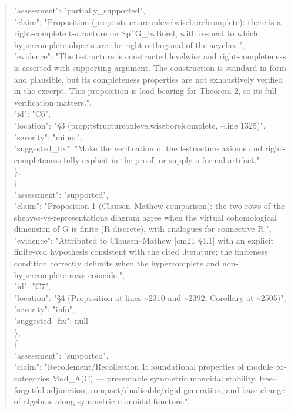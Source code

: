 \documentclass[11pt]{article}
\begin{document}
\begin{quote}
      "assessment": "partially\_supported",\\
      "claim": "Proposition (prop:tstructureonlevelwiseborelcomplete): there is a right-complete t-structure on Sp\^{}G\_lwBorel, with respect to which hypercomplete objects are the right orthogonal of the acyclics.",\\
      "evidence": "The t-structure is constructed levelwise and right-completeness is asserted with supporting argument. The construction is standard in form and plausible, but its completeness properties are not exhaustively verified in the excerpt. This proposition is load-bearing for Theorem 2, so its full verification matters.",\\
      "id": "C6",\\
      "location": "§3 (prop:tstructureonlevelwiseborelcomplete, \~{}line 1325)",\\
      "severity": "minor",\\
      "suggested\_fix": "Make the verification of the t-structure axioms and right-completeness fully explicit in the proof, or supply a formal artifact."\\
    \},\\
    \{\\
      "assessment": "supported",\\
      "claim": "Proposition 1 (Clausen--Mathew comparison): the two rows of the sheaves-vs-representations diagram agree when the virtual cohomological dimension of G is finite (R discrete), with analogues for connective R.",\\
      "evidence": "Attributed to Clausen--Mathew [cm21 §4.1] with an explicit finite-vcd hypothesis consistent with the cited literature; the finiteness condition correctly delimits when the hypercomplete and non-hypercomplete rows coincide.",\\
      "id": "C7",\\
      "location": "§4 (Proposition at lines \~{}2310 and \~{}2392; Corollary at \~{}2505)",\\
      "severity": "info",\\
      "suggested\_fix": null\\
    \},\\
    \{\\
      "assessment": "supported",\\
      "claim": "Recollement/Recollection 1: foundational properties of module \ensuremath{\infty}-categories Mod\_A(C) --- presentable symmetric monoidal stability, free--forgetful adjunction, compact/dualisable/rigid generation, and base change of algebras along symmetric monoidal functors.",\\

\end{quote}
\end{document}
